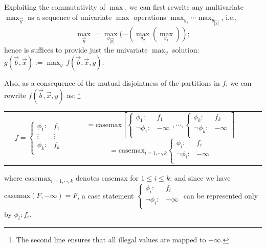 \documentclass[twoside,11pt]{article}
\newcommand{\casemax}{\mathrm{casemax}}
\begin{document}
Exploiting the commutativity of $\max$, we can first rewrite any multivariate $\max_{\vec{y}}$ as a sequence of univariate $\max$ operations 
$\max_{y_1} \cdots \max_{y_{|\vec{y}|}}$, i.e., 
$$\max_{\vec{y}}= \max_{y_{|\vec{y}|}} (\cdots (\max_{y_2}(\max_{y_1}));$$ hence is suffices to provide just the univariate $\max_{y}$ solution: $g(\vec{b},\vec{x}) := \max_{y}
\, f(\vec{b},\vec{x},y)$.

Also, as a consequence of the mutual disjointness of the partitions in $f$, we can rewrite $f(\vec{b},\vec{x},y)$ as: \footnote{The second line ensures that all illegal values are mapped to $-\infty$.}

{%
\begin{center}
\begin{tabular}{r c c l}
&
\hspace{-6mm} 
  $f = \begin{cases}
    \phi_1: & f_1 \\ 
   \vdots&\vdots\\ 
    \phi_k: & f_k \\ 
  \end{cases}$
&
\hspace{-2mm}
  $ =  \casemax \left[  \begin{cases}
    \phi_1: & f_1 \\
    \neg \phi_1: & -\infty \\    
  \end{cases}, 
  \cdots ,
  \begin{cases}
    \phi_k: & f_k \\
    \neg \phi_k: & -\infty \\    
  \end{cases}   
  \right]$
  \hspace{-2mm}
  $ = \casemax_{i=1,\cdots,k}\begin{cases}
    \phi_i: & f_i \\
    \neg \phi_i: & -\infty \\    
  \end{cases}$
  
\end{tabular}
\end{center}
}
where $\casemax_{i=1,\cdots,k}$ denotes $\casemax$ for $1\leq i \leq k$; and since we have $\casemax(F, -\infty) = F$, a case statement 
$ \begin{cases}
    \phi_i: & f_i \\
    \neg \phi_i: & -\infty \\    
  \end{cases}$ can be represented only by $\phi_i : f_i$.   
\end{document}
